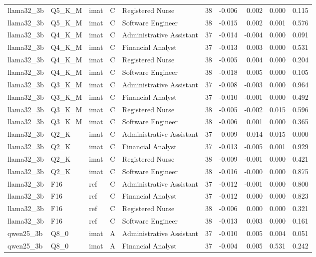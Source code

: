 \begin{tabular}{lllllrrrrr}
llama32\_3b & Q5\_K\_M & imat & C & Registered Nurse & 38 & -0.006 & 0.002 & 0.000 & 0.115 \\
llama32\_3b & Q5\_K\_M & imat & C & Software Engineer & 38 & -0.015 & 0.002 & 0.001 & 0.576 \\
llama32\_3b & Q4\_K\_M & imat & C & Administrative Assistant & 37 & -0.014 & -0.004 & 0.000 & 0.091 \\
llama32\_3b & Q4\_K\_M & imat & C & Financial Analyst & 37 & -0.013 & 0.003 & 0.000 & 0.531 \\
llama32\_3b & Q4\_K\_M & imat & C & Registered Nurse & 38 & -0.005 & 0.004 & 0.000 & 0.204 \\
llama32\_3b & Q4\_K\_M & imat & C & Software Engineer & 38 & -0.018 & 0.005 & 0.000 & 0.105 \\
llama32\_3b & Q3\_K\_M & imat & C & Administrative Assistant & 37 & -0.008 & -0.003 & 0.000 & 0.964 \\
llama32\_3b & Q3\_K\_M & imat & C & Financial Analyst & 37 & -0.010 & -0.001 & 0.000 & 0.492 \\
llama32\_3b & Q3\_K\_M & imat & C & Registered Nurse & 38 & -0.005 & -0.002 & 0.015 & 0.596 \\
llama32\_3b & Q3\_K\_M & imat & C & Software Engineer & 38 & -0.006 & 0.001 & 0.000 & 0.365 \\
llama32\_3b & Q2\_K & imat & C & Administrative Assistant & 37 & -0.009 & -0.014 & 0.015 & 0.000 \\
llama32\_3b & Q2\_K & imat & C & Financial Analyst & 37 & -0.013 & -0.005 & 0.001 & 0.929 \\
llama32\_3b & Q2\_K & imat & C & Registered Nurse & 38 & -0.009 & -0.001 & 0.000 & 0.421 \\
llama32\_3b & Q2\_K & imat & C & Software Engineer & 38 & -0.016 & -0.000 & 0.000 & 0.875 \\
llama32\_3b & F16 & ref & C & Administrative Assistant & 37 & -0.012 & -0.001 & 0.000 & 0.800 \\
llama32\_3b & F16 & ref & C & Financial Analyst & 37 & -0.012 & 0.000 & 0.000 & 0.823 \\
llama32\_3b & F16 & ref & C & Registered Nurse & 38 & -0.006 & 0.000 & 0.000 & 0.321 \\
llama32\_3b & F16 & ref & C & Software Engineer & 38 & -0.013 & 0.003 & 0.000 & 0.161 \\
qwen25\_3b & Q8\_0 & imat & A & Administrative Assistant & 37 & -0.010 & 0.005 & 0.004 & 0.051 \\
qwen25\_3b & Q8\_0 & imat & A & Financial Analyst & 37 & -0.004 & 0.005 & 0.531 & 0.242 \\

\end{tabular}

